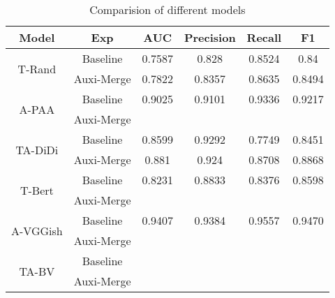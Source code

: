 \begin{table*}
\centering
\begin{tabular}{cccccc}
\hline
\textbf{Model} & \textbf{Exp} & \textbf{AUC} & \textbf{Precision} & \textbf{Recall} & \textbf{F1} \\
\hline
\multirow{2}{*}{T-Rand} & Baseline & 0.7587 & 0.828 & 0.8524 & 0.84 \\
& Auxi-Merge & 0.7822 & 0.8357 & 0.8635 & 0.8494 \\
\hline
\multirow{2}{*}{A-PAA} & Baseline & 0.9025 & 0.9101 & 0.9336 & 0.9217 \\
& Auxi-Merge & & & & \\
\hline
\multirow{2}{*}{TA-DiDi} & Baseline & 0.8599 & 0.9292 & 0.7749 & 0.8451 \\
& Auxi-Merge & 0.881 & 0.924 & 0.8708 & 0.8868 \\
\hline
\multirow{2}{*}{T-Bert} & Baseline & 0.8231 & 0.8833 & 0.8376 & 0.8598 \\
& Auxi-Merge & & & & \\
\hline
\multirow{2}{*}{A-VGGish} & Baseline & 0.9407 & 0.9384 & 0.9557 & 0.9470 \\
& Auxi-Merge & & & & \\
\hline
\multirow{2}{*}{TA-BV} & Baseline & & & & \\
& Auxi-Merge & & & & \\
\hline
\end{tabular}
\caption{\label{experimental-results} Comparision of different models}
\end{table*}